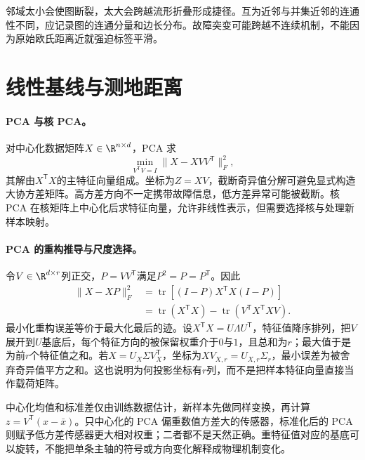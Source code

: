 邻域太小会使图断裂，太大会跨越流形折叠形成捷径。互为近邻与并集近邻的连通性不同，应记录图的连通分量和边长分布。故障突变可能跨越不连续机制，不能因为原始欧氏距离近就强迫标签平滑。

\section{线性基线与测地距离}
\paragraph{PCA 与核 PCA。}
对中心化数据矩阵$X\in\R^{n\times d}$，PCA 求
\begin{equation}
 \min_{V^{\mathsf T}V=I}\|X-XVV^{\mathsf T}\|_F^2,
\end{equation}
其解由$X^{\mathsf T}X$的主特征向量组成。坐标为$Z=XV$，截断奇异值分解可避免显式构造大协方差矩阵。高方差方向不一定携带故障信息，低方差异常可能被截断。核 PCA 在核矩阵上中心化后求特征向量，允许非线性表示，但需要选择核与处理新样本映射\cite{scholkopf1998kpca}。

\paragraph{PCA 的重构推导与尺度选择。}
令$V\in\R^{d\times r}$列正交，$P=VV^{\mathsf T}$满足$P^2=P=P^{\mathsf T}$。因此
\begin{align}
 \|X-XP\|_F^2
 &=\operatorname{tr}[(I-P)X^{\mathsf T}X(I-P)]\\
 &=\operatorname{tr}(X^{\mathsf T}X)-\operatorname{tr}(V^{\mathsf T}X^{\mathsf T}XV).
\end{align}
最小化重构误差等价于最大化最后的迹。设$X^{\mathsf T}X=U\Lambda U^{\mathsf T}$，特征值降序排列，把$V$展开到$U$基底后，每个特征方向的被保留权重介于$0$与$1$，且总和为$r$；最大值于是为前$r$个特征值之和。若$X=U_X\Sigma V_X^{\mathsf T}$，坐标为$XV_{X,r}=U_{X,r}\Sigma_r$，最小误差为被舍弃奇异值平方之和。这也说明为何投影坐标有$r$列，而不是把样本特征向量直接当作载荷矩阵。

中心化均值和标准差仅由训练数据估计，新样本先做同样变换，再计算$z=V^{\mathsf T}(x-\bar x)$。只中心化的 PCA 偏重数值方差大的传感器，标准化后的 PCA 则赋予低方差传感器更大相对权重；二者都不是天然正确。重特征值对应的基底可以旋转，不能把单条主轴的符号或方向变化解释成物理机制变化。

